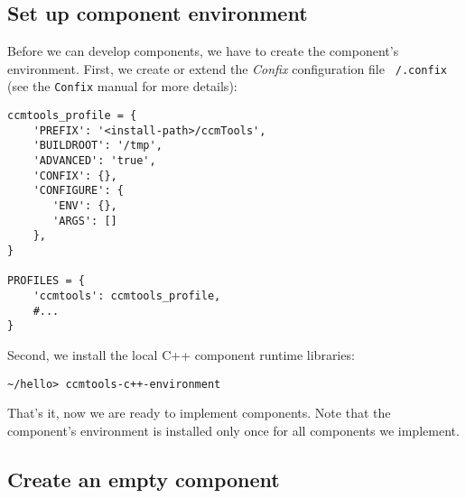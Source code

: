 \subsection{Set up component environment}

Before we can develop components, we have to create the component's environment.
First, we create or extend the {\it Confix} configuration file {\tt ~/.confix}
(see the {\tt Confix} manual for more details):
\begin{verbatim}
ccmtools_profile = {
    'PREFIX': '<install-path>/ccmTools',
    'BUILDROOT': '/tmp',
    'ADVANCED': 'true',
    'CONFIX': {},
    'CONFIGURE': {
       'ENV': {},
       'ARGS': []
    },
}
    
PROFILES = {
    'ccmtools': ccmtools_profile,
    #...
}
\end{verbatim}

\noindent
Second, we install the local C++ component runtime libraries:
\begin{verbatim}
~/hello> ccmtools-c++-environment
\end{verbatim}

\noindent
That's it, now we are ready to implement components. Note that the component's
environment is installed only once for all components we implement.


\subsection{Create an empty component}

